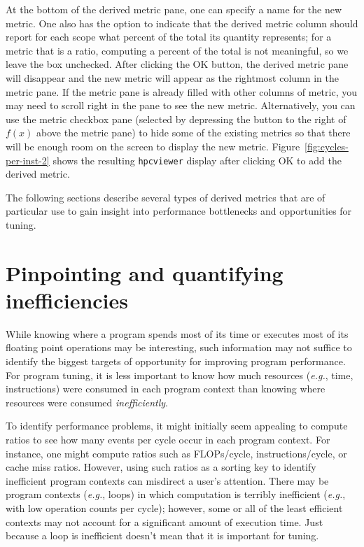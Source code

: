 \documentclass[12pt]{article}
\newcommand{\eg}{\emph{e.g.}}  %
\begin{document}
At the bottom of the derived metric pane, one can specify a name for the new metric. One also has the option to indicate that the derived metric column should report for each scope what percent of the total its quantity represents; for a metric that is a ratio, computing a percent of the total is not meaningful, so we leave the box unchecked. After clicking the OK button, the derived metric pane will disappear and the new metric will appear as the rightmost column in the metric pane. If the metric pane is already filled with other columns of metric, you may need to scroll right in the pane to see the new metric. Alternatively, you can use the metric checkbox pane (selected by depressing the button to the right of $f(x)$ above the metric pane) to hide some of the existing metrics so that there will be enough room on the screen to display the new metric. Figure~\ref{fig:cycles-per-inst-2} shows the resulting {\tt hpcviewer} display after clicking OK to add the derived metric.

The following sections describe several types of derived metrics that are of particular use to gain insight into performance bottlenecks and opportunities for tuning.

\section{Pinpointing and quantifying inefficiencies}

While knowing where a program spends most of its time or executes most of its floating point operations may be interesting, such information may not suffice to identify the biggest targets of opportunity for improving program performance. For program tuning, it is less important to know how much resources (\eg, time, instructions) were consumed in each program context than knowing where resources were consumed {\em inefficiently}.

To identify performance problems, it might initially seem appealing to compute ratios to see how many events per cycle occur in each program context. For instance, one might compute ratios such as FLOPs/cycle, instructions/cycle, or cache miss ratios. However, using such ratios as a sorting key to identify inefficient program contexts can misdirect a user's attention. There may be program contexts (\eg, loops) in which computation is terribly inefficient (\eg, with low operation counts per cycle); however, some or all of the least efficient contexts may not account for a significant amount of execution time. Just because a loop is inefficient doesn't mean that it is important for tuning. 
\end{document}
